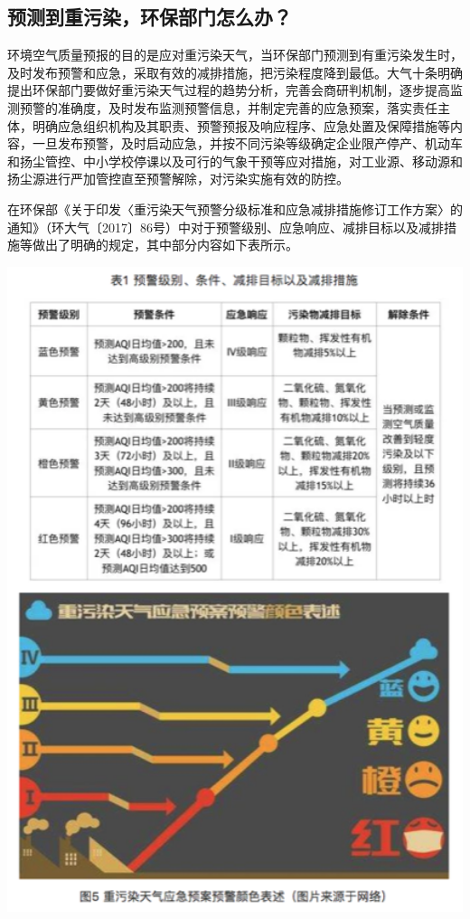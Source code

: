 \documentclass[
]{book}
\begin{document}
\hypertarget{ux9884ux6d4bux5230ux91cdux6c61ux67d3ux73afux4fddux90e8ux95e8ux600eux4e48ux529e}{%
\subsection{预测到重污染，环保部门怎么办？}\label{ux9884ux6d4bux5230ux91cdux6c61ux67d3ux73afux4fddux90e8ux95e8ux600eux4e48ux529e}}

环境空气质量预报的目的是应对重污染天气，当环保部门预测到有重污染发生时，及时发布预警和应急，采取有效的减排措施，把污染程度降到最低。大气十条明确提出环保部门要做好重污染天气过程的趋势分析，完善会商研判机制，逐步提高监测预警的准确度，及时发布监测预警信息，并制定完善的应急预案，落实责任主体，明确应急组织机构及其职责、预警预报及响应程序、应急处置及保障措施等内容，一旦发布预警，及时启动应急，并按不同污染等级确定企业限产停产、机动车和扬尘管控、中小学校停课以及可行的气象干预等应对措施，对工业源、移动源和扬尘源进行严加管控直至预警解除，对污染实施有效的防控。

在环保部《关于印发〈重污染天气预警分级标准和应急减排措施修订工作方案〉的通知》（环大气〔2017〕86号）中对于预警级别、应急响应、减排目标以及减排措施等做出了明确的规定，其中部分内容如下表所示。

\includegraphics[width=5.89in]{images/kqyb5}
\end{document}
